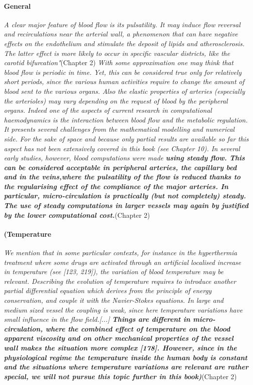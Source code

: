 \documentclass[11pt,letterpaper]{article}
\begin{document}
\paragraph{General} \textit{A clear major feature of blood flow is its pulsatility. It may induce flow
reversal and recirculations near the arterial wall, a phenomenon that can have negative effects on the endothelium and stimulate the deposit of lipids and atherosclerosis. The latter effect is more likely to occur in specific vascular districts, like the carotid bifurcation"}(Chapter 2) \newline\newline \textit{With some approximation one may think that blood flow is periodic in time. Yet, this can be considered true only for relatively short periods, since the various human activities require to change the amount of blood sent to the various organs. Also the elastic properties of arteries (especially the arterioles) may vary depending on the request of blood by the peripheral organs. Indeed one of the aspects of current research in computational haemodynamics is the interaction between blood flow and the metabolic regulation. It presents several challenges from the mathematical modelling and numerical side. For the sake of space and because only partial results are available so far this aspect has not been extensively covered in this book (see Chapter 10). In several early studies, however, blood computations were made \textbf{using
steady flow. This can be considered acceptable in peripheral arteries, the capillary bed and in the veins,where the pulsatility of the flow is reduced thanks to the regularising effect of the compliance of the major arteries. In particular, micro-circulation is practically (but not completely) steady. The use of steady computations in larger vessels may again by justified by the lower computational cost.}}(Chapter 2)

\paragraph{(Temperature} \textit{We mention that in some particular contexts, for instance in the hyperthermia treatment where some drugs are activated through an artificial localised increase in temperature (see [123, 219]), the variation of blood temperature may be relevant. Describing the evolution of temperature requires to introduce another partial differential equation which derives from the principle of energy conservation, and couple it with the Navier-Stokes equations. In large and medium sized vessel the coupling is weak, since here temperature variations have small influence in the flow field.[...] \textbf{Things are different in micro-circulation, where the combined effect of temperature on the blood apparent viscosity and on other mechanical properties of the vessel wall makes the situation more complex [178]. However, since in the physiological regime the temperature inside the human body is constant and the situations where temperature variations are relevant are rather special, we will not pursue this topic further in this book}\textbf{)}}(Chapter 2)
\end{document}
